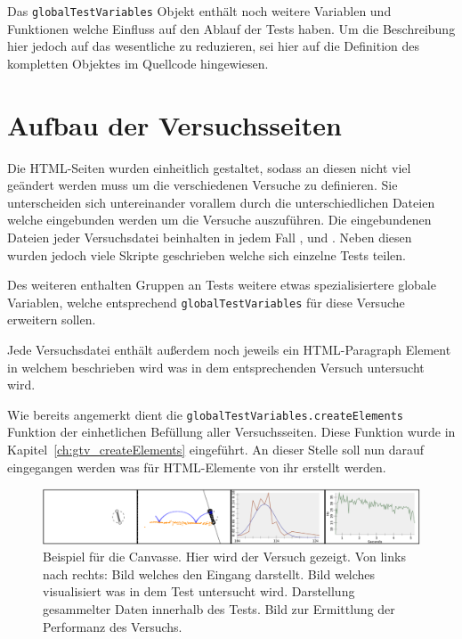 Das \lstinline{globalTestVariables} Objekt enthält noch weitere Variablen und Funktionen welche Einfluss auf den Ablauf der Tests haben.
Um die Beschreibung hier jedoch auf das wesentliche zu reduzieren, sei hier auf die Definition des kompletten Objektes im Quellcode %
hingewiesen.


\section{Aufbau der Versuchsseiten}\label{ch:aufbau_der_testseiten}

Die HTML-Seiten wurden einheitlich gestaltet, sodass an diesen nicht viel geändert werden muss um die verschiedenen Versuche zu definieren.
Sie unterscheiden sich untereinander vorallem durch die unterschiedlichen Dateien welche eingebunden werden um die Versuche auszuführen.
Die eingebundenen Dateien jeder Versuchsdatei beinhalten in jedem Fall ,  und .
Neben diesen wurden jedoch viele Skripte geschrieben welche sich einzelne Tests teilen.

Des weiteren enthalten Gruppen an Tests weitere etwas spezialisiertere globale Variablen, welche entsprechend \lstinline{globalTestVariables} für diese Versuche erweitern sollen.

Jede Versuchsdatei enthält au{\ss}erdem noch jeweils ein HTML-Paragraph Element %
in welchem beschrieben wird was in dem entsprechenden Versuch untersucht wird.

Wie bereits angemerkt dient die \lstinline{globalTestVariables.createElements} Funktion der einhetlichen Befüllung aller Versuchsseiten.
Diese Funktion wurde in Kapitel~\ref{ch:gtv_createElements} eingeführt.
An dieser Stelle soll nun darauf eingegangen werden was für HTML-Elemente von ihr erstellt werden.

\begin{figure}
    \includegraphics[width=\textwidth]{gfx/canvasses.png}
    \caption[Bild der Canvasse]{Beispiel für die Canvasse. Hier wird der Versuch  gezeigt. Von links nach rechts: Bild welches den Eingang darstellt. Bild welches visualisiert was in dem Test untersucht wird. Darstellung gesammelter Daten innerhalb des Tests. Bild zur Ermittlung der Performanz des Versuchs.}\label{fig:canvasses}
\end{figure}



